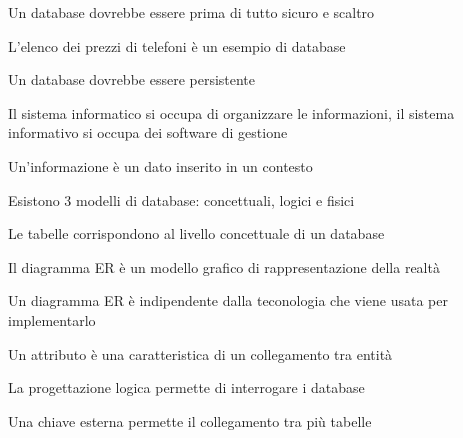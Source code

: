 \documentclass[addpoints]{exam}
\newcommand{\tf}[1][{}]{%
	\fillin[#1][0.25in]%
}
\begin{document}
\begin{multicols}{2}
\begin{questions}
\question[1] \tf[F] Un database dovrebbe essere prima di tutto sicuro e scaltro

\question[1] \tf[T] L'elenco dei prezzi di telefoni è un esempio di database

\question[1] \tf[T] Un database dovrebbe essere persistente

\question[1] \tf[F] Il sistema informatico si occupa di organizzare le informazioni, il sistema informativo si occupa dei software di gestione

\question[1] \tf[T] Un'informazione è un dato inserito in un contesto

\question[1] \tf[T] Esistono 3 modelli di database: concettuali, logici e fisici

\question[1] \tf[F] Le tabelle corrispondono al livello concettuale di un database

\question[1] \tf[T] Il diagramma ER è un modello grafico di rappresentazione della realtà

\question[1] \tf[T] Un diagramma ER è indipendente dalla teconologia che viene usata per implementarlo

\question[1] \tf[F] Un attributo è una caratteristica di un collegamento tra entità

\question[1] \tf[F] La progettazione logica permette di interrogare i database

\question[1] \tf[T] Una chiave esterna permette il collegamento tra più tabelle

\end{questions}
\end{multicols}
\end{document}
